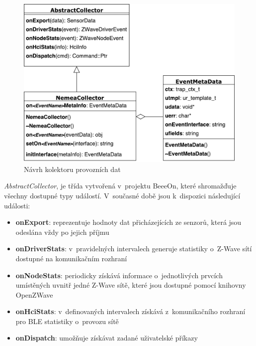  \begin{figure}[ht]
   \begin{center}
   \includegraphics[scale=0.5]{pictures/modelTrid}
   \caption{Návrh kolektoru provozních dat}
   \label{obr.modelTrid}
   \end{center}
   \end{figure}
 
 \textit{AbstractCollector}, je třída vytvořená v~projektu BeeeOn, které shromažďuje všechny dostupné
 typy událostí.
 V~současné době jsou k~dispozici následující události:
 \begin{itemize}
  \item \textbf{onExport}:
   reprezentuje hodnoty dat přicházejících ze senzorů, která jsou odeslána vždy po jejich příjmu
   
  \item \textbf{onDriverStats}:
   v~pravidelných intervalech generuje statistiky o~Z-Wave sítí dostupné na komunikačním 
   rozhraní
   
  \item \textbf{onNodeStats}:
   periodicky získává informace o~jednotlivých prvcích umístěných uvnitř jedné Z-Wave sítě, které jsou dostupné pomocí
   knihovny OpenZWave
   
  \item \textbf{onHciStats}:
   v~definovaných intervalech získává z~komunikačního rozhraní pro BLE statistiky o~provozu
   sítě
  
  \item \textbf{onDispatch}:
  umožňuje získávat zadané uživatelské příkazy
 \end{itemize}

